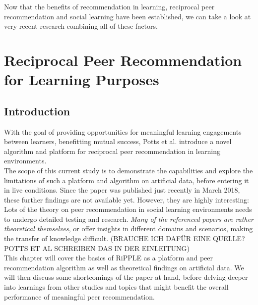 \documentclass[nochapterpage,bigchapter,linedtoc,longdoc,colorback,accentcolor=tud3b,oneside]{tudreport}
\begin{document}
Now that the benefits of recommendation in learning, reciprocal peer recommendation and social learning have been established, we can take a look at very recent research combining all of these factors.\\

\chapter{Reciprocal Peer Recommendation for Learning Purposes}
\section{Introduction}
With the goal of providing opportunities for meaningful learning engagements between learners, benefitting mutual success, Potts et al. introduce a novel algorithm and platform for reciprocal peer recommendation in learning environments.\\
The scope of this current study is to demonstrate the capabilities and explore the limitations of such a platform and algorithm on artificial data, before entering it in live conditions. Since the paper was published just recently in March 2018, these further findings are not available yet. However, they are highly interesting: Lots of the theory on peer recommendation in social learning environments needs to undergo detailed testing and research. \textit{Many of the referenced papers are rather theoretical themselves}, or offer insights in different domains and scenarios, making the transfer of knowledge difficult. (BRAUCHE ICH DAFÜR EINE QUELLE? POTTS ET AL SCHREIBEN DAS IN DER EINLEITUNG)\\
This chapter will cover the basics of RiPPLE as a platform and peer recommendation algorithm as well as theoretical findings on artificial data. We will then discuss some shortcomings of the paper at hand, before delving deeper into learnings from other studies and topics that might benefit the overall performance of meaningful peer recommendation.\\
\end{document}
